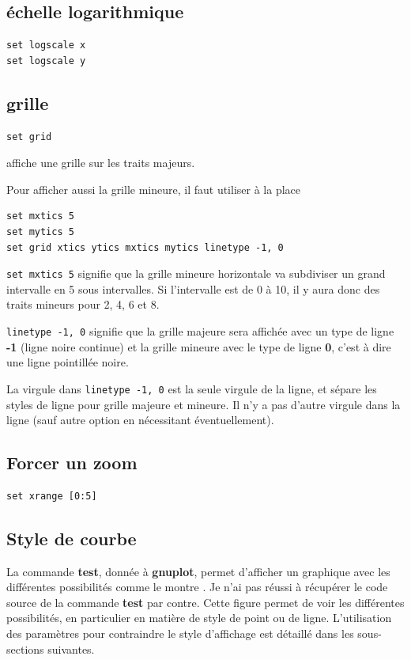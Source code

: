 \documentclass[a4paper,twoside]{article}
\begin{document}
\subsection{échelle logarithmique}
\begin{verbatim}
set logscale x
set logscale y
\end{verbatim}

\subsection{grille}
\begin{verbatim}
set grid
\end{verbatim}
affiche une grille sur les traits majeurs.

Pour afficher aussi la grille mineure, il faut utiliser à la place 
\begin{verbatim}
set mxtics 5
set mytics 5
set grid xtics ytics mxtics mytics linetype -1, 0
\end{verbatim}
\texttt{set mxtics 5} signifie que la grille mineure horizontale va subdiviser un grand intervalle en 5 sous intervalles. Si l'intervalle est de 0 à 10, il y aura donc des traits mineurs pour 2, 4, 6 et 8. 

\texttt{linetype -1, 0} signifie que la grille majeure sera affichée avec un type de ligne \textbf{-1} (ligne noire continue) et la grille mineure avec le type de ligne \textbf{0}, c'est à dire une ligne pointillée noire.

\begin{attention}
La virgule dans \texttt{linetype -1, 0} est la seule virgule de la ligne, et sépare les styles de ligne pour grille majeure et mineure. Il n'y a pas d'autre virgule dans la ligne (sauf autre option en nécessitant éventuellement).
\end{attention}




\subsection{Forcer un zoom}
\begin{verbatim}
set xrange [0:5]
\end{verbatim}

\subsection{Style de courbe}
La commande \textbf{test}, donnée à \textbf{gnuplot}, permet d'afficher un graphique avec les différentes possibilités comme le montre . Je n'ai pas réussi à récupérer le code source de la commande \textbf{test} par contre. Cette figure permet de voir les différentes possibilités, en particulier en matière de style de point ou de ligne. L'utilisation des paramètres pour contraindre le style d'affichage est détaillé dans les sous-sections suivantes.
\end{document}
